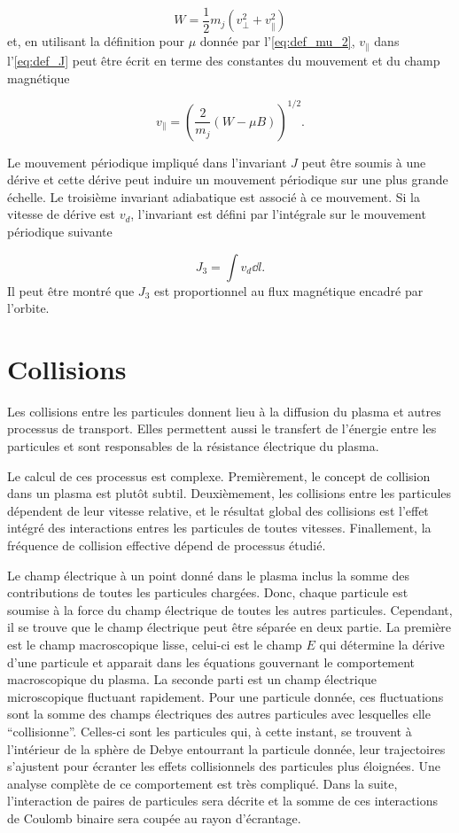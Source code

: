 \documentclass[main.tex]{subfiles}
\begin{document}
\[
	W = \frac{1}{2} m_j \left( v_\perp^2 + v_\parallel^2\right)
\]
et, en utilisant la définition pour \( \mu \) donnée par l'\autoref{eq:def_mu_2}, \( v_\parallel \) dans l'\autoref{eq:def_J} peut être écrit en terme des constantes du mouvement et du champ magnétique

\[
	v_\parallel = \left( \frac{2}{m_j} \left( W - \mu B \right) \right)^{1/2}.
\]

Le mouvement périodique impliqué dans l'invariant \( J \) peut être soumis à une dérive et cette dérive peut induire un mouvement périodique sur une plus grande échelle.
Le troisième invariant adiabatique est associé à ce mouvement.
Si la vitesse de dérive est \( v_d \), l'invariant est défini par l'intégrale sur le mouvement périodique suivante

\[
	J_3 = \int v_d \dd l.
\]
Il peut être montré que \( J_3 \) est proportionnel au flux magnétique encadré par l’orbite.

\section{Collisions}
\label{sec:collisions}

Les collisions entre les particules donnent lieu à la diffusion du plasma et autres processus de transport.
Elles permettent aussi le transfert de l'énergie entre les particules et sont responsables de la résistance électrique du plasma.

Le calcul de ces processus est complexe.
Premièrement, le concept de collision dans un plasma est plutôt subtil.
Deuxièmement, les collisions entre les particules dépendent de leur vitesse relative, et le résultat global des collisions est l'effet intégré des interactions entres les particules de toutes vitesses.
Finallement, la fréquence de collision effective dépend de processus étudié.

Le champ électrique à un point donné dans le plasma inclus la somme des contributions de toutes les particules chargées.
Donc, chaque particule est soumise à la force du champ électrique de toutes les autres particules.
Cependant, il se trouve que le champ électrique peut être séparée en deux partie.
La première est le champ macroscopique lisse, celui-ci est le champ \( E \) qui détermine la dérive d'une particule et apparait dans les équations gouvernant le comportement macroscopique du plasma. La seconde parti est un champ électrique microscopique fluctuant rapidement.
Pour une particule donnée, ces fluctuations sont la somme des champs électriques des autres particules avec lesquelles elle ``collisionne''.
Celles-ci sont les particules qui, à cette instant, se trouvent à l'intérieur de la sphère de Debye entourrant la particule donnée, leur trajectoires s’ajustent pour écranter les effets collisionnels des particules plus éloignées.
Une analyse complète de ce comportement est très compliqué.
Dans la suite, l'interaction de paires de particules sera décrite et la somme de ces interactions de Coulomb binaire sera coupée au rayon d'écrantage.
\end{document}
